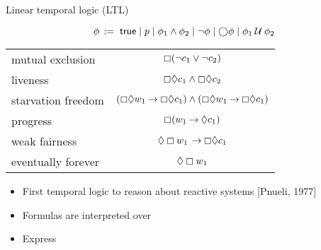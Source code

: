 \documentclass{beamer}
\begin{document}
%


\begin{slide}{Linear temporal logic (LTL)}\label{s:44}
\small

\[
\phi\, := \; \true \mid p \mid  \phi_1 \wedge \phi_2 \mid \neg \phi \mid \nexts \phi \mid  \phi_1 \until \phi_2 %
\]
\vspace{0.5cm}
\begin{center}
\begin{tabular}{|l|c|}
\hline
mutual exclusion  & $\boxempty (\neg c_1 \vee \neg c_2)$ \\
 liveness & $\boxempty \Diamond c_1 \wedge \boxempty \Diamond c_2$\\
starvation freedom  & $(\boxempty \Diamond w_1 \mathbin{\rightarrow} \boxempty \Diamond c_1) \wedge
(\boxempty \Diamond w_1 \mathbin{\rightarrow} \boxempty \Diamond c_1)$ \\
progress & $\boxempty (w_1 \mathbin{\rightarrow} \Diamond c_1)$\\
weak fairness & $\Diamond \boxempty w_1 \, \mathbin{\rightarrow} \boxempty \Diamond c_1$\\
eventually forever & $\Diamond \boxempty w_1$\\
\hline
\end{tabular}  
\end{center}

\begin{itemize}
\item First temporal logic to reason about reactive systems [Pnueli, 1977]
\item Formulas are interpreted over 
\item Express 
\end{itemize}
\end{slide}
\end{document}
